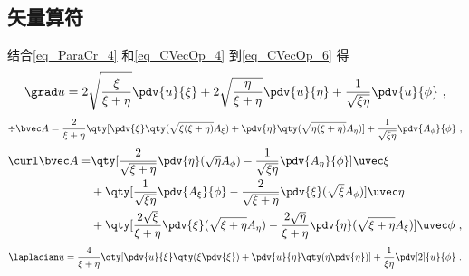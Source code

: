\subsection{矢量算符}

结合\autoref{eq_ParaCr_4} 和\autoref{eq_CVecOp_4} 到\autoref{eq_CVecOp_6} 得
\begin{equation}
\grad u = 2\sqrt{\frac{\xi}{\xi + \eta}}\pdv{u}{\xi} + 2\sqrt{\frac{\eta}{\xi + \eta}}\pdv{u}{\eta} + \frac{1}{\sqrt{\xi\eta}}\pdv{u}{\phi}~,
\end{equation}
\begin{equation}
\div \bvec A = \frac{2}{\xi + \eta}\qty[\pdv{\xi}\qty(\sqrt{\xi(\xi+\eta)}A_\xi) + \pdv{\eta}\qty(\sqrt{\eta(\xi+\eta)}A_\eta)] + \frac{1}{\sqrt{\xi\eta}} \pdv{A_\phi}{\phi}~,
\end{equation}
\begin{equation}
\begin{aligned}
\curl \bvec A = &\qty[\frac{2}{\sqrt{\xi+\eta}}\pdv{\eta} (\sqrt{\eta}A_\phi) - \frac{1}{\sqrt{\xi\eta}}\pdv{A_\eta}{\phi}]\uvec \xi\\
&+\qty[\frac{1}{\sqrt{\xi\eta}}\pdv{A_\xi}{\phi} - \frac{2}{\sqrt{\xi+\eta}}\pdv{\xi}(\sqrt{\xi}A_\phi)]\uvec\eta\\
&+\qty[\frac{2\sqrt{\xi}}{\xi+\eta}\pdv{\xi}(\sqrt{\xi+\eta}A_\eta) - \frac{2\sqrt{\eta}}{\xi+\eta}\pdv{\eta}(\sqrt{\xi+\eta}A_\xi)]\uvec\phi~,
\end{aligned}
\end{equation}
\begin{equation} %
\laplacian u = \frac{4}{\xi + \eta} \qty[\pdv{u}{\xi}\qty(\xi\pdv{\xi}) + \pdv{u}{\eta}\qty(\eta\pdv{\eta})] + \frac{1}{\xi\eta}\pdv[2]{u}{\phi}~.
\end{equation}
